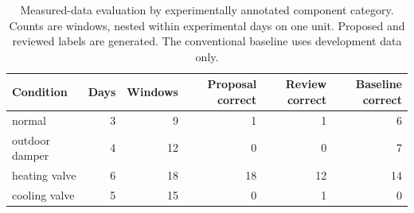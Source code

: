\begin{table}[t]
\caption{Measured-data evaluation by experimentally annotated component category. Counts are windows, nested within experimental days on one unit. Proposed and reviewed labels are generated. The conventional baseline uses development data only.}
\centering\small
\begin{tabular}{lrrrrr}
\toprule
Condition & Days & Windows & Proposal correct & Review correct & Baseline correct \\
\midrule
normal & 3 & 9 & 1 & 1 & 6 \\
outdoor damper & 4 & 12 & 0 & 0 & 7 \\
heating valve & 6 & 18 & 18 & 12 & 14 \\
cooling valve & 5 & 15 & 0 & 1 & 0 \\
\bottomrule
\end{tabular}
\end{table}
